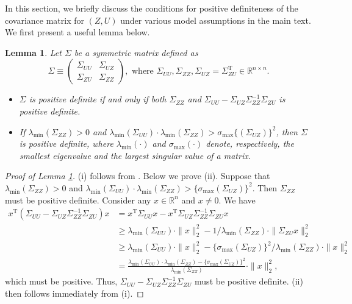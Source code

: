\documentclass[11pt]{article}
\newtheorem{lemma}{Lemma}
\theoremstyle{definition}
\theoremstyle{remark}
\def\top{{ \mathrm{\scriptscriptstyle T} }}
\begin{document}
In this section, we briefly discuss the conditions for  positive definiteness of the covariance matrix for $(Z,U)$ under various model assumptions in the main text. 
We first present a useful lemma below. 




\begin{lemma}\label{lem:pd-schur}
Let $\Sigma$ be a symmetric matrix defined as 
\[
\Sigma \equiv \begin{pmatrix}
\Sigma_{UU} & \Sigma_{UZ} \\
\Sigma_{ZU} & \Sigma_{ZZ}
\end{pmatrix}, 
\text{ where } \Sigma_{UU}, \Sigma_{ZZ}, \Sigma_{UZ} = \Sigma_{ZU}^\top \in \mathbb{R}^{n\times n}. 
\]
\begin{itemize}
    \item[(i)] $\Sigma$ is positive definite if and only if both $\Sigma_{ZZ}$ and $\Sigma_{UU} - \Sigma_{UZ} \Sigma_{ZZ}^{-1} \Sigma_{ZU}$ is positive definite. 

    \item[(ii)] If $\lambda_{\min}(\Sigma_{ZZ})> 0$ and  $\lambda_{\min}(\Sigma_{UU}) \cdot \lambda_{\min}(\Sigma_{ZZ}) > \sigma_{\max}\{ (\Sigma_{UZ})\}^2$, then $\Sigma$ is positive definite, where $\lambda_{\min}(\cdot)$ and $\sigma_{\max}(\cdot)$ denote, respectively, the smallest eigenvalue and the largest singular value of a matrix. 
\end{itemize}
\end{lemma}
\begin{proof}[Proof of Lemma \ref{lem:pd-schur}]
(i) follows from \citet[Theorem 1.12(a)]{zhang2006schur}. 
Below we prove (ii). 
Suppose that  $\lambda_{\min}(\Sigma_{ZZ})> 0$ and   $\lambda_{\min}(\Sigma_{UU}) \cdot \lambda_{\min}(\Sigma_{ZZ}) > \{\sigma_{\max} (\Sigma_{UZ})\}^2$. Then $\Sigma_{ZZ}$ must be positive definite. 
Consider any $x \in \mathbb{R}^{n}$ and $x \ne 0$. We have 
\begin{align*}
    x^\top (\Sigma_{UU} - \Sigma_{UZ} \Sigma_{ZZ}^{-1} \Sigma_{ZU}) x & = x^\top \Sigma_{UU} x - x^\top \Sigma_{UZ} \Sigma_{ZZ}^{-1} \Sigma_{ZU} x \\
    & \ge \lambda_{\min}(\Sigma_{UU}) \cdot \|x\|_2^2 - 1/\lambda_{\min}(\Sigma_{ZZ}) \cdot \|\Sigma_{ZU} x \|_2^2\\
    & \ge \lambda_{\min}(\Sigma_{UU}) \cdot \|x\|_2^2 - \{\sigma_{\max} (\Sigma_{UZ})\}^2/\lambda_{\min}(\Sigma_{ZZ}) \cdot \|x\|_2^2\\
    & = \frac{\lambda_{\min}(\Sigma_{UU}) \cdot \lambda_{\min}(\Sigma_{ZZ})- \{\sigma_{\max} (\Sigma_{UZ})\}^2}{\lambda_{\min}(\Sigma_{ZZ})}  \cdot \|x\|_2^2,
\end{align*}
which must be positive. 
Thus, $\Sigma_{UU} - \Sigma_{UZ} \Sigma_{ZZ}^{-1} \Sigma_{ZU}$ must be positive definite. (ii) then follows immediately from (i). 
\end{proof}
 
\end{document}
